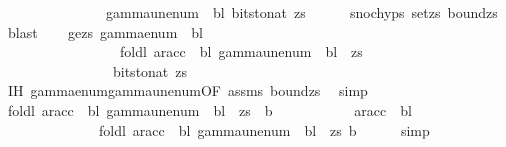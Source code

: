 \begin{isabellebody}
\ \ \ \ \ \ \ \ \ \ \ \ \ \ {\isacharequal}{\kern0pt}\ gamma{\isacharunderscore}{\kern0pt}unenum\ {\isasymGamma}\ bl\ {\isacharparenleft}{\kern0pt}bits{\isacharunderscore}{\kern0pt}to{\isacharunderscore}{\kern0pt}nat\ zs{\isacharparenright}{\kern0pt}{\isachardoublequoteclose}\isanewline
\ \ \ \ \isamarkupfalse%
\ snoc{\isachardot}{\kern0pt}hyps\ set{\isacharunderscore}{\kern0pt}zs\ bound{\isacharunderscore}{\kern0pt}zs\ \isamarkupfalse%
\ blast\isanewline
\ \ \isamarkupfalse%
\ ge{\isacharunderscore}{\kern0pt}zs{\isacharcolon}{\kern0pt}\ {\isachardoublequoteopen}gamma{\isacharunderscore}{\kern0pt}enum\ {\isasymGamma}\ bl\isanewline
\ \ \ \ \ \ \ \ \ \ \ \ \ \ \ \ \ {\isacharparenleft}{\kern0pt}foldl\ {\isacharparenleft}{\kern0pt}ar{\isacharunderscore}{\kern0pt}acc\ {\isasymGamma}\ bl{\isacharparenright}{\kern0pt}\ {\isacharparenleft}{\kern0pt}gamma{\isacharunderscore}{\kern0pt}unenum\ {\isasymGamma}\ bl\ {}{\isacharparenright}{\kern0pt}\ zs{\isacharparenright}{\kern0pt}\isanewline
\ \ \ \ \ \ \ \ \ \ \ \ \ \ \ {\isacharequal}{\kern0pt}\ bits{\isacharunderscore}{\kern0pt}to{\isacharunderscore}{\kern0pt}nat\ zs{\isachardoublequoteclose}\isanewline
\ \ \ \ \isamarkupfalse%
\ IH\ gamma{\isacharunderscore}{\kern0pt}enum{\isacharunderscore}{\kern0pt}gamma{\isacharunderscore}{\kern0pt}unenum{\isacharbrackleft}{\kern0pt}OF\ assms\ bound{\isacharunderscore}{\kern0pt}zs{\isacharbrackright}{\kern0pt}\ \isamarkupfalse%
\ simp\isanewline
\ \ \isamarkupfalse%
\ {\isachardoublequoteopen}foldl\ {\isacharparenleft}{\kern0pt}ar{\isacharunderscore}{\kern0pt}acc\ {\isasymGamma}\ bl{\isacharparenright}{\kern0pt}\ {\isacharparenleft}{\kern0pt}gamma{\isacharunderscore}{\kern0pt}unenum\ {\isasymGamma}\ bl\ {}{\isacharparenright}{\kern0pt}\ {\isacharparenleft}{\kern0pt}zs\ {\isacharat}{\kern0pt}\ {\isacharbrackleft}{\kern0pt}b{\isacharbrackright}{\kern0pt}{\isacharparenright}{\kern0pt}\isanewline
\ \ \ \ \ \ \ \ \ \ {\isacharequal}{\kern0pt}\ ar{\isacharunderscore}{\kern0pt}acc\ {\isasymGamma}\ bl\isanewline
\ \ \ \ \ \ \ \ \ \ \ \ \ \ {\isacharparenleft}{\kern0pt}foldl\ {\isacharparenleft}{\kern0pt}ar{\isacharunderscore}{\kern0pt}acc\ {\isasymGamma}\ bl{\isacharparenright}{\kern0pt}\ {\isacharparenleft}{\kern0pt}gamma{\isacharunderscore}{\kern0pt}unenum\ {\isasymGamma}\ bl\ {}{\isacharparenright}{\kern0pt}\ zs{\isacharparenright}{\kern0pt}\ b{\isachardoublequoteclose}\isanewline
\ \ \ \ \isamarkupfalse%
\ simp\isanewline

\end{isabellebody}
